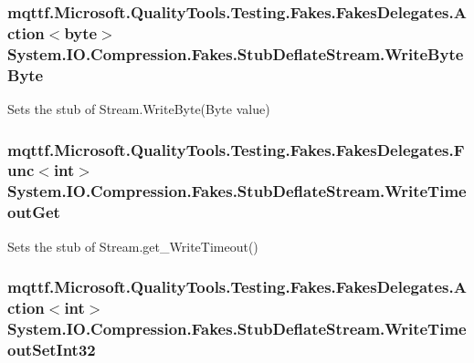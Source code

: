 \hypertarget{class_system_1_1_i_o_1_1_compression_1_1_fakes_1_1_stub_deflate_stream_ab22a858d1864a91fcd466d5bc07f8ccd}{
\subsubsection[{Write\-Byte\-Byte}]{\setlength{\rightskip}{0pt plus 5cm}mqttf.\-Microsoft.\-Quality\-Tools.\-Testing.\-Fakes.\-Fakes\-Delegates.\-Action$<$byte$>$ System.\-I\-O.\-Compression.\-Fakes.\-Stub\-Deflate\-Stream.\-Write\-Byte\-Byte}}\label{class_system_1_1_i_o_1_1_compression_1_1_fakes_1_1_stub_deflate_stream_ab22a858d1864a91fcd466d5bc07f8ccd}


Sets the stub of Stream.\-Write\-Byte(\-Byte value)

\hypertarget{class_system_1_1_i_o_1_1_compression_1_1_fakes_1_1_stub_deflate_stream_a7234fd44465737621d5da352c8432c49}{
\subsubsection[{Write\-Timeout\-Get}]{\setlength{\rightskip}{0pt plus 5cm}mqttf.\-Microsoft.\-Quality\-Tools.\-Testing.\-Fakes.\-Fakes\-Delegates.\-Func$<$int$>$ System.\-I\-O.\-Compression.\-Fakes.\-Stub\-Deflate\-Stream.\-Write\-Timeout\-Get}}\label{class_system_1_1_i_o_1_1_compression_1_1_fakes_1_1_stub_deflate_stream_a7234fd44465737621d5da352c8432c49}


Sets the stub of Stream.\-get\-\_\-\-Write\-Timeout()

\hypertarget{class_system_1_1_i_o_1_1_compression_1_1_fakes_1_1_stub_deflate_stream_a4963c1874df557fe42f456e6311324d6}{
\subsubsection[{Write\-Timeout\-Set\-Int32}]{\setlength{\rightskip}{0pt plus 5cm}mqttf.\-Microsoft.\-Quality\-Tools.\-Testing.\-Fakes.\-Fakes\-Delegates.\-Action$<$int$>$ System.\-I\-O.\-Compression.\-Fakes.\-Stub\-Deflate\-Stream.\-Write\-Timeout\-Set\-Int32}}\label{class_system_1_1_i_o_1_1_compression_1_1_fakes_1_1_stub_deflate_stream_a4963c1874df557fe42f456e6311324d6}


